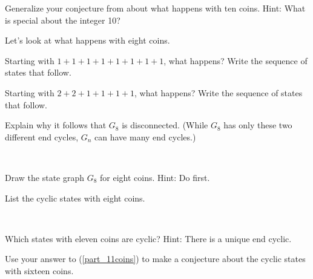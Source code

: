
\begin{exer}[\exerU] %
\label{exer_bulg_sol_generalize_10coins}
    Generalize your conjecture from  about what happens with ten coins. Hint: What is special about the integer 10?    
\end{exer}

\begin{exer}[\exerU] %
\label{exer_bulg_sol_8coins}
    Let's look at what happens with eight coins.
        \begin{exerpart}
            \item Starting with $1+1+1+1+1+1+1+1$, what happens?  Write the sequence of states that follow. 
            \item Starting with $2+2+1+1+1+1$, what happens?  Write the sequence of states that follow. 
            \item Explain why it follows that $G_8$ is disconnected.  (While $G_8$ has only these two different end cycles, $G_n$ can have many end cycles.)
        \end{exerpart}    
\end{exer}

\begin{exer}[\exerU] %
\label{exer_bulg_sol_8coins_graph}
~
    \begin{exerpart}
        \item Draw the state graph $G_8$ for eight coins.  Hint:  Do  first.
        \item List the cyclic states with eight coins.
    \end{exerpart}   
\end{exer}

\begin{exer}[\exerU] %
\label{exer_bulg_sol_11coins}
~
    \begin{exerpart}
        \item \label{part_11coins} Which states with eleven coins are cyclic?  Hint: There is a unique end cyclic.
        \item Use your answer to (\ref{part_11coins}) to make a conjecture about the cyclic states with sixteen coins.
    \end{exerpart}    
\end{exer}


